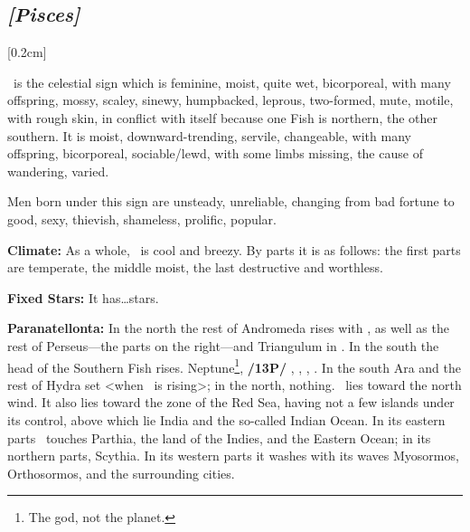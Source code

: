 \secbr
\subsection{\textit{[Pisces]}}
[0.2cm]

 \Pisces\, is the celestial sign which is  feminine,  moist, quite wet,  bicorporeal, with many offspring, mossy, scaley, sinewy, humpbacked, leprous,  two-formed,  mute, motile, with rough skin, in conflict with itself because one Fish is northern, the other southern. It is moist, downward-trending,  servile, changeable, with many offspring, bicorporeal, sociable/lewd, with some limbs missing, the cause of wandering, varied.

Men born under this sign are unsteady, unreliable, changing from bad fortune to good, sexy, thievish, shameless, prolific, popular.

\textbf{Climate:} As a whole, \Pisces\, is cool and breezy. By parts it is as follows: the first parts are temperate, the
middle moist, the last destructive and worthless. 

\textbf{Fixed Stars:} It has…stars. 

\textbf{Paranatellonta:} In the north the rest of Andromeda rises with \Pisces, as well as the rest of Perseus—the parts on the right—and Triangulum in \Aries. In the south the head of the Southern Fish rises. Neptune\footnote{The god, not the planet.}, \textbf{/13P/} \Mars, \Mercury, \Venus, \Jupiter. In the south Ara and the rest of Hydra set <when \Pisces\, is rising>; in the north, nothing. \Pisces\, lies toward the north wind. It also lies toward the zone of the Red Sea, having not a few islands under its control, above which lie India and the so-called Indian Ocean. In its eastern parts \Pisces\, touches Parthia, the land of the Indies, and the Eastern Ocean; in its northern parts, Scythia. In its western parts it washes with its waves Myosormos, Orthosormos, and the surrounding cities.

